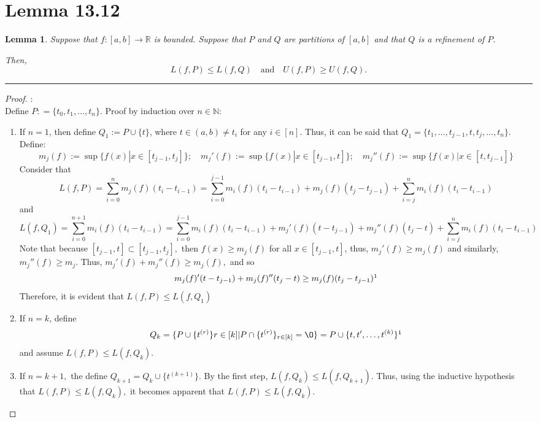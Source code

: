 \documentclass[openany, amssymb, psamsfonts]{amsart}
\newcommand{\bbN}{\mathbb{N}}
\newcommand{\bbR}{\mathbb{R}}
\renewcommand{\emptyset}{\O}
\newtheorem{lem}{Lemma}[section]
\theoremstyle{definition}
\numberwithin{equation}{section}
\begin{document}
\section*{Lemma 13.12}
\begin{lem}
\label{13.12}
Suppose that $f\colon [a, b] \to \bbR$ is bounded.
	Suppose that $P$ and $Q$ are partitions of $[a, b]$ and that $Q$ is a refinement of $P$.
	
	Then,
	\[
		L(f, P) \leq L(f, Q) \quad \text{and} \quad U(f, P) \geq U(f, Q).
	\]
\end{lem}
\vspace{4pt}     \hrule   \vspace{4pt} \begin{proof}:\\
Define $P: = \{t_0, t_1, \dots , t_n\}.$ Proof by induction over $n\in \bbN$:
\begin{enumerate}
    \item If $n=1$, then define $Q_1 := P \cup \{t\}$, where $t \in (a,b) \neq t_i$ for any $i\in [n].$ Thus, it can be said that $Q_1 = \{t_1, \dots, t_{j-1}, t, t_j, \dots, t_n\}$. Define: \[m_j(f):= \sup\{f(x)| x\in [t_{j-1}, t_j]\}; \quad m_j'(f):= \sup\{f(x)| x\in [t_{j-1}, t]\}; \quad m_j''(f):= \sup\{f(x)| x\in [t, t_{j-1}]\}\] 
    Consider that \[L(f,P) = \sum_{i=0}^nm_j(f)(t_{i} - t_{i-1}) =  \sum_{i=0}^{j-1}m_i(f)(t_{i} - t_{i-1}) + m_j(f)(t_j- t_{j-1}) +  \sum_{i=j}^{n}m_i(f)(t_{i} - t_{i-1})\] 
    and 
    \[L(f,Q_1) = \sum_{i=0}^{n+1}m_i(f)(t_{i} - t_{i-1}) =  \sum_{i=0}^{j-1}m_i(f)(t_{i} - t_{i-1}) + m_j'(f)(t- t_{j-1}) + m_j''(f)(t_j- t)  + \sum_{i=j}^{n}m_i(f)(t_{i} - t_{i-1})\] 
    Note that because $[t_{j-1}, t]\subset [t_{j-1}, t_j],$ then $f(x)\geq m_j(f)$ for all $x \in [t_{j-1}, t]$, thus, $m_j'(f) \geq m_j(f)$ and similarly, $m_j''(f) \geq m_j$. Thus, $m_j'(f) + m_j''(f) \geq m_j(f),$ and so \[m_j(f)'(t- t_{j-1}) + m_j(f)''(t_j- t) \geq m_j(f)(t_j - t_{j-1})\footnote{This is using the property that if $x+y = z$, then $ax + ay = (a+b)z$}\] Therefore, it is evident that  $L(f,P)\leq L(f,Q_1)$ 
    \item If $n=k$, define \[Q_k = \{P \cup \{t^{(r)}\}{r\in [k]} | P \cap \{t^{(r)}\}_{r\in [k]} = \emptyset \} = P \cup \{t, t', \dots, t^{(k)}\}\footnote{i.e, This is just adding a set of distinct numbers between a and b that are not in P}\] and assume $L(f,P)\leq L(f,Q_k).$
    \item If $n=k+1,$ the define $Q_{k+1} = Q_k \cup \{t^{(k+1)}\}.$ By the first step, $L(f,Q_k)\leq L(f,Q_{k+1})$. Thus, using the inductive hypothesis that $L(f,P)\leq L(f,Q_k),$ it becomes apparent that $L(f,P)\leq L(f,Q_k).$

\end{enumerate}
\end{proof}
\end{document}
